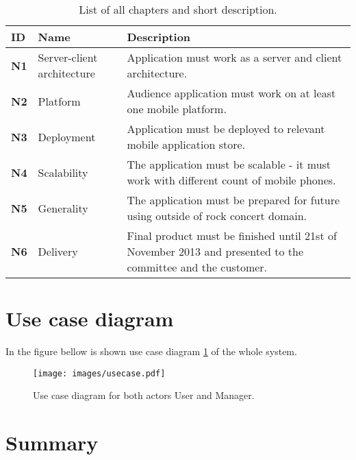 \begin{table*}[!h]\centering
\caption{List of all chapters and short description. }
\label{tab:req_nonfunc}
\def\arraystretch{1.3}
\begin{tabularx}{\textwidth}{llX}
\toprule[1mm]
\textbf{ID} & Name & Description\\
\midrule
\textbf{N1} & Server-client architecture & Application must work as a server and client architecture.\\
\textbf{N2} & Platform & Audience application must work on at least one mobile platform.\\
\textbf{N3} & Deployment & Application must be deployed to relevant mobile application store.\\
\textbf{N4} & Scalability & The application must be scalable - it must work with different count of mobile phones.\\
\textbf{N5} & Generality & The application must be prepared for future using outside of rock concert domain.\\
\textbf{N6} & Delivery & Final product must be finished until 21st of November 2013 and presented to the committee and the customer.\\
\bottomrule[1mm]

\end{tabularx}
\end{table*}
\section{Use case diagram}
In the figure bellow is shown use case diagram \ref{img:usecase} of the whole system.

\begin{figure}[h]
    \begin{center}
    \texttt{[image: images/usecase.pdf]}
    \caption{Use case diagram for both actors User and Manager.}
    \label{img:usecase}
    \end{center}
\end{figure}

%	
%		

\section{Summary}
